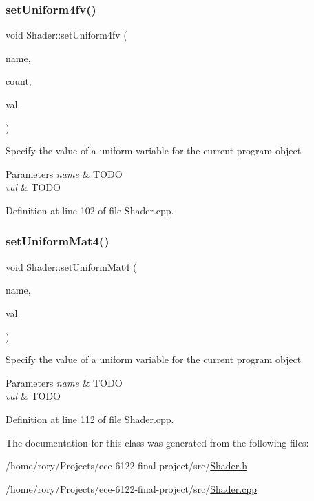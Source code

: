 \subsubsection{\texorpdfstring{set\+Uniform4fv()}{setUniform4fv()}}
{\footnotesize\ttfamily void Shader\+::set\+Uniform4fv (\begin{DoxyParamCaption}\item[{const G\+Lchar $\ast$}]{name,  }\item[{G\+Lsizei}]{count,  }\item[{const G\+Lfloat $\ast$}]{val }\end{DoxyParamCaption})}

Specify the value of a uniform variable for the current program object 
\begin{DoxyParams}{Parameters}
{\em name} & T\+O\+DO \\
\hline
{\em val} & T\+O\+DO \\
\hline
\end{DoxyParams}


Definition at line 102 of file Shader.\+cpp.

\mbox{\label{class_shader_a15a1246f61f63dd1d202bb59447dc191}} 
\subsubsection{\texorpdfstring{set\+Uniform\+Mat4()}{setUniformMat4()}}
{\footnotesize\ttfamily void Shader\+::set\+Uniform\+Mat4 (\begin{DoxyParamCaption}\item[{const G\+Lchar $\ast$}]{name,  }\item[{const glm\+::mat4 \&}]{val }\end{DoxyParamCaption})}

Specify the value of a uniform variable for the current program object 
\begin{DoxyParams}{Parameters}
{\em name} & T\+O\+DO \\
\hline
{\em val} & T\+O\+DO \\
\hline
\end{DoxyParams}


Definition at line 112 of file Shader.\+cpp.



The documentation for this class was generated from the following files\+:\begin{DoxyCompactItemize}
\item 
/home/rory/\+Projects/ece-\/6122-\/final-\/project/src/\hyperlink{_shader_8h}{Shader.\+h}\item 
/home/rory/\+Projects/ece-\/6122-\/final-\/project/src/\hyperlink{_shader_8cpp}{Shader.\+cpp}\end{DoxyCompactItemize}
